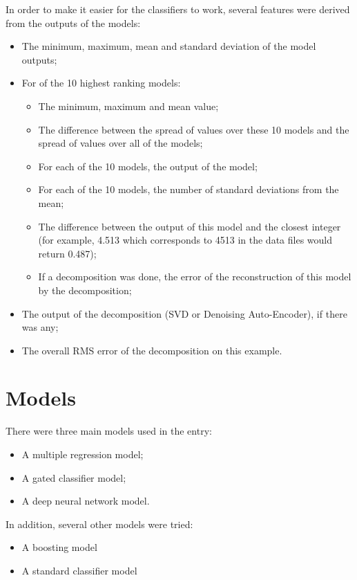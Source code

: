 \documentclass{article}
\begin{document}
In order to make it easier for the classifiers to work, several features were derived from the outputs of the models:

\begin{itemize}
\item The minimum, maximum, mean and standard deviation of the model outputs;
\item For of the 10 highest ranking models:
  \begin{itemize}
    \item The minimum, maximum and mean value;
    \item The difference between the spread of values over these 10 models and the spread of values over all of the models;
    \item For each of the 10 models, the output of the model;
    \item For each of the 10 models, the number of standard deviations from the mean;
    \item The difference between the output of this model and the closest integer (for example, 4.513 which corresponds to 4513 in the data files would return 0.487);
    \item If a decomposition was done, the error of the reconstruction of this model by the decomposition;
  \end{itemize}
\item The output of the decomposition (SVD or Denoising Auto-Encoder), if there was any;
\item The overall RMS error of the decomposition on this example.

\end{itemize}


\section{Models}

There were three main models used in the entry:

\begin{itemize}
\item A multiple regression model;
\item A gated classifier model;
\item A deep neural network model.
\end{itemize}

In addition, several other models were tried:

\begin{itemize}
\item A boosting model
\item A standard classifier model
\end{itemize}
\end{document}
